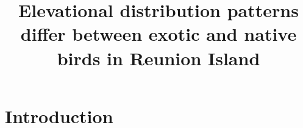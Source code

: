 \documentclass{article}\usepackage[]{graphicx}\usepackage[]{color}
\title{Elevational distribution patterns differ between exotic and native birds in Reunion Island}
\begin{document}

\maketitle

\noindent

\begin{abstract}
\end{abstract}


\section*{Introduction}
\end{document}
